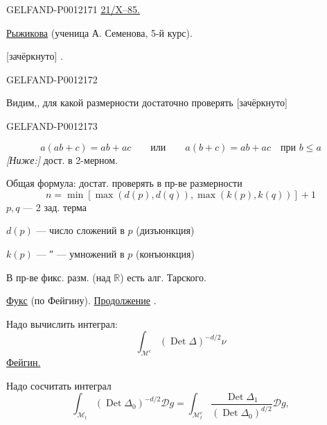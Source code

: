 \begin{GelfandAdjacentEvidence}{GELFAND-P001217}{1}
\underline{\underline{21/X--85.}}\qquad {}

\underline{\underline{Рыжикова}} (ученица А. Семенова, 5-й курс).

 [зачёркнуто] .
\end{GelfandAdjacentEvidence}
\begin{GelfandAdjacentEvidence}{GELFAND-P001217}{2}


Видим,, для какой размерности достаточно проверять [зачёркнуто]
\end{GelfandAdjacentEvidence}
\begin{GelfandAdjacentEvidence}{GELFAND-P001217}{3}

\[
a(ab+c)=ab+ac\qquad\text{или}\qquad
a(b+c)=ab+ac\quad\text{при }b\leq a
\]
\textit{[Ниже:]} дост. в 2-мерном.

Общая формула: достат. проверять в пр-ве размерности
\[
n=\min[\max(d(p),d(q)),\max(k(p),k(q))]+1
\]
\(p,q\) --- 2 зад. терма

\(d(p)\) --- число сложений в \(p\) (дизъюнкция)

\(k(p)\) --- ″ --- умножений в \(p\) (конъюнкция)

В пр-ве фикс. разм. (над \(\mathbb R\)) есть алг. Тарского.

\underline{\underline{Фукс}} (по Фейгину). \underline{Продолжение} .

Надо вычислить интеграл:
\begin{equation*}
\int_{\mathcal M^c}(\operatorname{Det}\Delta)^{-d/2}\nu\tag{1}
\end{equation*}
\underline{Фейгин.}

Надо сосчитать интеграл
\begin{equation*}
\int_{\mathcal M_t}(\operatorname{Det}\Delta_0)^{-d/2}\mathcal Dg
=\int_{\mathcal M_t^c}\frac{\operatorname{Det}\Delta_1}{(\operatorname{Det}\Delta_0)^{d/2}}\mathcal Dg,\tag{2}
\end{equation*}
\end{GelfandAdjacentEvidence}
